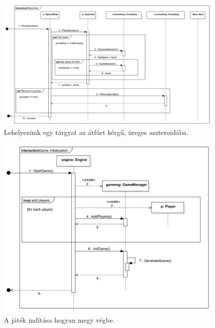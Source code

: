 \begin{figure}[H] 
\centering 
\includegraphics[width=1\textwidth]{docs/3_Project/svg/Design Model!Place resource in inventory!successful placement!Place item_23.png} 
\caption{Lehelyezünk egy tárgyat az átfúrt kérgű, üreges aszteroidába.} 
\end{figure} 

\begin{figure}[H] 
\centering 
\includegraphics[width=1\textwidth]{docs/3_Project/svg/Design Model!Game Init!Game initialization!Game initialization_24.png} 
\caption{A játék indítása hogyan megy végbe.} 
\end{figure} 

